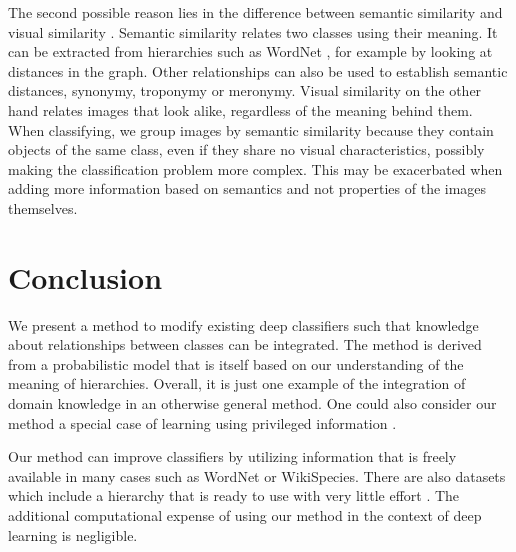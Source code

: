 \documentclass[10pt,twocolumn,letterpaper]{article}
\begin{document}
The second possible reason lies in the difference between semantic similarity
and visual similarity \cite{Deselaers2011Visual}. Semantic similarity relates two classes using their
meaning. It can be extracted from hierarchies such as WordNet \cite{Fellbaum1998WordNet},
for example by looking at distances in the graph. Other relationships can also
be used to establish semantic distances, \eg synonymy, troponymy or meronymy.
Visual similarity on the other hand relates images that look alike, regardless
of the meaning behind them. When classifying, we group images by semantic similarity
because they contain objects of the same class, even if they share no visual characteristics,
possibly making the classification problem more complex. This may be exacerbated when adding
more information based on semantics and not properties of the images themselves.



\section{Conclusion}
We present a method to modify existing deep classifiers such that knowledge
about relationships between classes can be integrated. The method is derived
from a probabilistic model that is itself based on our understanding of the
meaning of hierarchies. Overall, it is just one example of the integration
of domain knowledge in an otherwise general method. One could also consider
our method a special case of learning using privileged information
\cite{Vapnik2009LUPI}.

Our method can improve classifiers by utilizing information that is freely
available in many cases such as WordNet \cite{Fellbaum1998WordNet} or
WikiSpecies.
There are also datasets which include a hierarchy that is ready to use with
very little effort \cite{Deng2009ImageNet,VanHorn2015NAB}.
The additional computational expense of using our method in the context
of deep learning is negligible.






{\small


}
\end{document}
